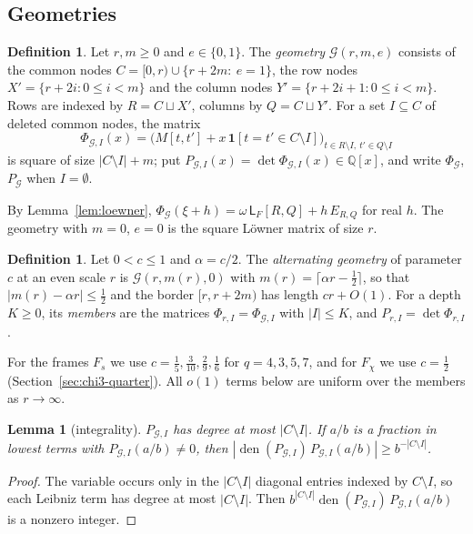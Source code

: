 \documentclass[11pt]{amsart}
\newtheorem{lemma}[theorem]{Lemma}
\theoremstyle{definition}
\newtheorem{definition}[theorem]{Definition}
\theoremstyle{remark}
\numberwithin{equation}{section}
\newcommand{\Q}{\mathbb Q}
\newcommand{\den}{\operatorname{den}}
\newcommand{\Lw}{\mathsf L}          %
\begin{document}
\subsection{Geometries}
\begin{definition}\label{def:geometry}
Let $r,m\ge0$ and $e\in\{0,1\}$. The \emph{geometry} $\mathcal G(r,m,e)$ consists of the common nodes
$C=[0,r)\cup\{r+2m:\ e=1\}$, the row nodes $X'=\{r+2i:0\le i<m\}$ and the column nodes
$Y'=\{r+2i+1:0\le i<m\}$. Rows are indexed by $R=C\sqcup X'$, columns by $Q=C\sqcup Y'$. For a set $I\subseteq C$ of
deleted common nodes, the matrix
\[
 \Phi_{\mathcal G,I}(x)=\bigl(M[t,t']+x\,\mathbf 1[t=t'\in C\setminus I]\bigr)_{t\in R\setminus I,\ t'\in Q\setminus I}
\]
is square of size $|C\setminus I|+m$; put $P_{\mathcal G,I}(x)=\det\Phi_{\mathcal G,I}(x)\in\Q[x]$, and write
$\Phi_{\mathcal G}$, $P_{\mathcal G}$ when $I=\emptyset$.
\end{definition}

By Lemma~\ref{lem:loewner}, $\Phi_{\mathcal G}(\xi+h)=\omega\,\Lw_F[R,Q]+h\,E_{R,Q}$ for real $h$. The geometry
with $m=0$, $e=0$ is the square L\"owner matrix of size $r$.

\begin{definition}\label{def:altgeom}
Let $0<c\le1$ and $\alpha=c/2$. The \emph{alternating geometry} of parameter $c$ at an even scale $r$ is
$\mathcal G(r,m(r),0)$ with $m(r)=\lceil\alpha r-\frac12\rceil$, so that $|m(r)-\alpha r|\le\frac12$ and the border
$[r,r+2m)$ has length $cr+O(1)$. For a depth $K\ge0$, its \emph{members} are the matrices $\Phi_{r,I}=\Phi_{\mathcal G,I}$
with $|I|\le K$, and $P_{r,I}=\det\Phi_{r,I}$.
\end{definition}

For the frames $F_s$ we use $c=\frac15,\frac3{10},\frac29,\frac16$ for $q=4,3,5,7$, and for $F_\chi$ we use $c=\frac12$
(Section~\ref{sec:chi3-quarter}). All $o(1)$ terms below are uniform over the members as $r\to\infty$.

\begin{lemma}[integrality]\label{lem:integrality}
$P_{\mathcal G,I}$ has degree at most $|C\setminus I|$. If $a/b$ is a fraction
in lowest terms with $P_{\mathcal G,I}(a/b)\ne0$, then $|\den(P_{\mathcal G,I})\,P_{\mathcal G,I}(a/b)|\ge b^{-|C\setminus I|}$.
\end{lemma}
\begin{proof}
The variable occurs only in the $|C\setminus I|$ diagonal entries indexed by $C\setminus I$, so each Leibniz term has
degree at most $|C\setminus I|$. Then $b^{|C\setminus I|}\den(P_{\mathcal G,I})\,P_{\mathcal G,I}(a/b)$ is a nonzero integer.
\end{proof}
\end{document}
